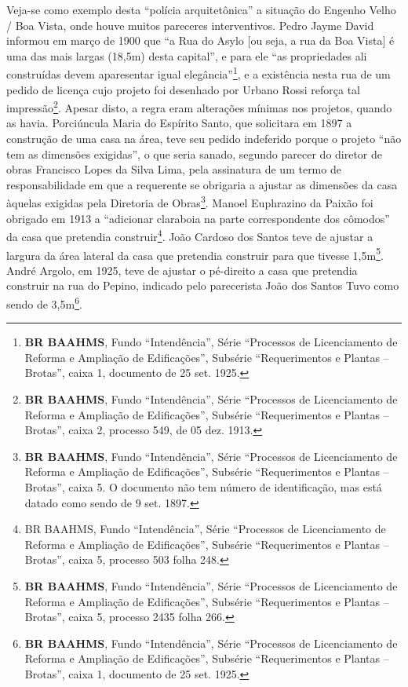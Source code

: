 Veja-se como exemplo desta ``polícia arquitetônica'' a situação do Engenho Velho / Boa Vista, onde houve muitos pareceres interventivos. Pedro Jayme David informou em março de 1900 que ``a Rua do Asylo [ou seja, a rua da Boa Vista] é uma das mais largas (18,5m) desta capital'', e para ele ``as propriedades ali construídas devem aparesentar igual elegância''\footnote{\textbf{BR BAAHMS}, Fundo ``Intendência'', Série ``Processos de Licenciamento de Reforma e Ampliação de Edificações'', Subsérie ``Requerimentos e Plantas – Brotas'', caixa 1, documento de 25 set. 1925.}, e a existência nesta rua de um pedido de licença cujo projeto foi desenhado por Urbano Rossi reforça tal impressão\footnote{\textbf{BR BAAHMS}, Fundo ``Intendência'', Série ``Processos de Licenciamento de Reforma e Ampliação de Edificações'', Subsérie ``Requerimentos e Plantas – Brotas'', caixa 2, processo 549, de 05 dez. 1913.}. Apesar disto, a regra eram alterações mínimas nos projetos, quando as havia. Porciúncula Maria do Espírito Santo, que solicitara em 1897 a construção de uma casa na área, teve seu pedido indeferido porque o projeto ``não tem as dimensões exigidas'', o que seria sanado, segundo parecer do diretor de obras Francisco Lopes da Silva Lima, pela assinatura de um termo de responsabilidade em que a requerente se obrigaria a ajustar as dimensões da casa àquelas exigidas pela Diretoria de Obras\footnote{\textbf{BR BAAHMS}, Fundo ``Intendência'', Série ``Processos de Licenciamento de Reforma e Ampliação de Edificações'', Subsérie ``Requerimentos e Plantas – Brotas'', caixa 5. O documento não tem número de identificação, mas está datado como sendo de 9 set. 1897.}. Manoel Euphrazino da Paixão foi obrigado em 1913 a ``adicionar claraboia na parte correspondente dos cômodos'' da casa que pretendia construir\footnote{BR BAAHMS, Fundo ``Intendência'', Série ``Processos de Licenciamento de Reforma e Ampliação de Edificações'', Subsérie ``Requerimentos e Plantas – Brotas'', caixa 5, processo 503 folha 248.}. João Cardoso dos Santos teve de ajustar a largura da área lateral da casa que pretendia construir para que tivesse 1,5m\footnote{\textbf{BR BAAHMS}, Fundo ``Intendência'', Série ``Processos de Licenciamento de Reforma e Ampliação de Edificações'', Subsérie ``Requerimentos e Plantas – Brotas'', caixa 5, processo 2435 folha 266.}. André Argolo, em 1925, teve de ajustar o pé-direito a casa que pretendia construir na rua do Pepino, indicado pelo parecerista João dos Santos Tuvo como sendo de 3,5m\footnote{\textbf{BR BAAHMS}, Fundo ``Intendência'', Série ``Processos de Licenciamento de Reforma e Ampliação de Edificações'', Subsérie ``Requerimentos e Plantas – Brotas'', caixa 1, documento de 25 set. 1925.}. 

